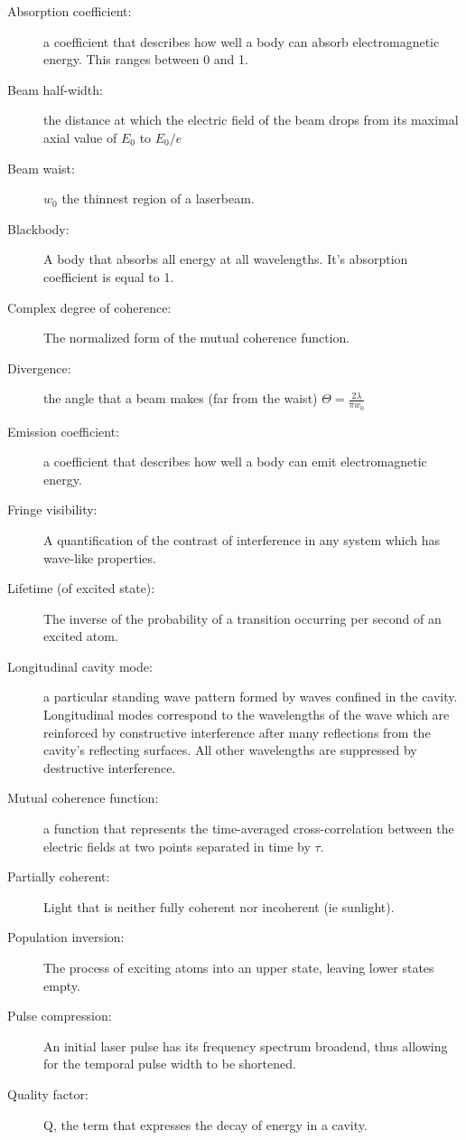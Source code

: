 \documentclass[12pt]{report}
\begin{document}
\begin{description}
\item[Absorption coefficient: ] a coefficient that describes how well a body can absorb electromagnetic energy. This ranges between 0 and 1. 
\item[Beam half-width: ] the distance at which the electric field of the beam drops from its maximal axial value of $E_0$ to $E_0 / e$
\item[Beam waist: ] $w_0$ the thinnest region of a laserbeam. 
\item[Blackbody: ] A body that absorbs all energy at all wavelengths. It's absorption coefficient is equal to 1. 
\item[Complex degree of coherence: ] The normalized form of the mutual coherence function. 
\item[Divergence: ] the angle that a beam makes (far from the waist) $\Theta = \frac{2 \lambda}{\pi w_0}$
\item[Emission coefficient: ] a coefficient that describes how well a body can emit electromagnetic energy. 
\item[Fringe visibility: ] A quantification of the contrast of interference in any system which has wave-like properties. 
\item[Lifetime (of excited state): ] The inverse of the probability of a transition occurring per second of an excited atom. 
\item[Longitudinal cavity mode: ] a particular standing wave pattern formed by waves confined in the cavity. Longitudinal modes correspond to the wavelengths of the wave which are reinforced by constructive interference after many reflections from the cavity's reflecting surfaces. All other wavelengths are suppressed by destructive interference. 
\item[Mutual coherence function: ] a function that represents the time-averaged cross-correlation between the electric fields at two points separated in time by $\tau$. 
\item[Partially coherent: ] Light that is neither fully coherent nor incoherent (ie sunlight). 
\item[Population inversion: ] The process of exciting atoms into an upper state, leaving lower states empty. 
\item[Pulse compression: ] An initial laser pulse has its frequency spectrum broadend, thus allowing for the temporal pulse width to be shortened. 
\item[Quality factor: ] Q, the term that expresses the decay of energy in a cavity. 

\end{description}
\end{document}

